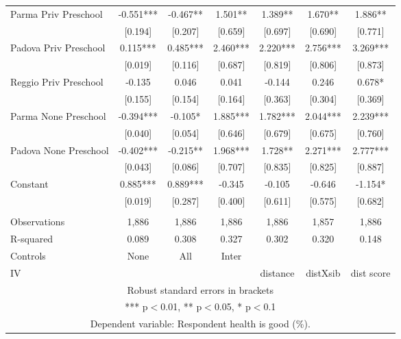 \begin{tabular}{lcccccc}
Parma Priv Preschool & -0.551*** & -0.467** & 1.501** & 1.389** & 1.670** & 1.886** \\
 & [0.194] & [0.207] & [0.659] & [0.697] & [0.690] & [0.771] \\
Padova Priv Preschool & 0.115*** & 0.485*** & 2.460*** & 2.220*** & 2.756*** & 3.269*** \\
 & [0.019] & [0.116] & [0.687] & [0.819] & [0.806] & [0.873] \\
Reggio Priv Preschool & -0.135 & 0.046 & 0.041 & -0.144 & 0.246 & 0.678* \\
 & [0.155] & [0.154] & [0.164] & [0.363] & [0.304] & [0.369] \\
Parma None Preschool & -0.394*** & -0.105* & 1.885*** & 1.782*** & 2.044*** & 2.239*** \\
 & [0.040] & [0.054] & [0.646] & [0.679] & [0.675] & [0.760] \\
Padova None Preschool & -0.402*** & -0.215** & 1.968*** & 1.728** & 2.271*** & 2.777*** \\
 & [0.043] & [0.086] & [0.707] & [0.835] & [0.825] & [0.887] \\
Constant & 0.885*** & 0.889*** & -0.345 & -0.105 & -0.646 & -1.154* \\
 & [0.019] & [0.287] & [0.400] & [0.611] & [0.575] & [0.682] \\
 &  &  &  &  &  &  \\
Observations & 1,886 & 1,886 & 1,886 & 1,886 & 1,857 & 1,886 \\
R-squared & 0.089 & 0.308 & 0.327 & 0.302 & 0.320 & 0.148 \\
Controls & None & All & Inter &  &  &  \\
 IV &  &  &  & distance & distXsib & dist score \\ \hline
\multicolumn{7}{c}{ Robust standard errors in brackets} \\
\multicolumn{7}{c}{ *** p$<$0.01, ** p$<$0.05, * p$<$0.1} \\
\multicolumn{7}{c}{ Dependent variable: Respondent health is good (\%).} \\
\end{tabular}
